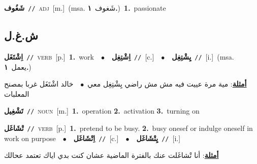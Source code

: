 \documentclass[10pt,a4paper,twoside]{article} %
\begin{document}
\begin{multicols}{2}
{\setlength\topsep{0pt}\textbf{\foreignlanguage{arabic}{شَغُوف}}\ {\color{gray}\texttt{//}\color{black}}\ \textsc{adj}\ [m.]\ \color{gray}(msa. \foreignlanguage{arabic}{شَغوف}~\foreignlanguage{arabic}{\textbf{١.}})\color{black}\ \textbf{1.}~passionate\ } \vspace{2mm}

\vspace{-3mm}
\subsection*{\color{blue}\foreignlanguage{arabic}{ش.غ.ل}\color{blue}{}} 

{\setlength\topsep{0pt}\textbf{\foreignlanguage{arabic}{اِشْتَغَل}}\ {\color{gray}\texttt{//}\color{black}}\ \textsc{verb}\ [p.]\ \textbf{1.}~work\ \ $\bullet$\ \ \setlength\topsep{0pt}\textbf{\foreignlanguage{arabic}{اِشْتِغِل}}\ {\color{gray}\texttt{//}\color{black}}\ [c.]\ \ $\bullet$\ \ \setlength\topsep{0pt}\textbf{\foreignlanguage{arabic}{يِشْتِغِل}}\ {\color{gray}\texttt{//}\color{black}}\ [i.]\ \color{gray}(msa. \foreignlanguage{arabic}{يعمل}~\foreignlanguage{arabic}{\textbf{١.}})\color{black}\  \begin{flushright}\color{gray}\foreignlanguage{arabic}{\textbf{\underline{\foreignlanguage{arabic}{أمثلة}}}: مية مرة عييت فيه مش مش راضي يِشْتِغِل معي\ $\bullet$\ \  خالد اشْتَغَل غربا بمصنح المعلبات}\end{flushright}\color{black}} \vspace{2mm}

{\setlength\topsep{0pt}\textbf{\foreignlanguage{arabic}{تَشْغِيل}}\ {\color{gray}\texttt{//}\color{black}}\ \textsc{noun}\ [m.]\ \textbf{1.}~operation  \textbf{2.}~activation  \textbf{3.}~turning on\ } \vspace{2mm}

{\setlength\topsep{0pt}\textbf{\foreignlanguage{arabic}{تْشَاغَل}}\ {\color{gray}\texttt{//}\color{black}}\ \textsc{verb}\ [p.]\ \textbf{1.}~pretend to be busy.  \textbf{2.}~busy onesef or indulge oneself in work on purpose\ \ $\bullet$\ \ \setlength\topsep{0pt}\textbf{\foreignlanguage{arabic}{اِتْشَاغَل}}\ {\color{gray}\texttt{//}\color{black}}\ [c.]\ \ $\bullet$\ \ \setlength\topsep{0pt}\textbf{\foreignlanguage{arabic}{يِتْشَاغَل}}\ {\color{gray}\texttt{//}\color{black}}\ [i.]\  \begin{flushright}\color{gray}\foreignlanguage{arabic}{\textbf{\underline{\foreignlanguage{arabic}{أمثلة}}}: أنا تْشاغَلت عنك بالفترة الماضية عشان كنت بدي اياك تعتمد عحالك}\end{flushright}\color{black}} \vspace{2mm}


\end{multicols}
\end{document}
